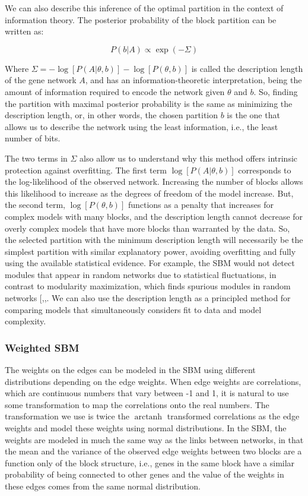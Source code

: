\documentclass[
]{article}
\begin{document}
We can also describe this inference of the optimal partition in the
context of information theory. The posterior probability of the block
partition can be written as:

\[
P(b|A) \propto \exp(-\Sigma)
\]

Where \(\Sigma = -\log[P(A|\theta, b)] - \log[P(\theta,b)]\) is called
the description length of the gene network \(A\), and has an
information-theoretic interpretation, being the amount of information
required to encode the network given \(\theta\) and \(b\). So, finding
the partition with maximal posterior probability is the same as
minimizing the description length, or, in other words, the chosen
partition \(b\) is the one that allows us to describe the network using
the least information, i.e., the least number of bits.

The two terms in \(\Sigma\) also allow us to understand why this method
offers intrinsic protection against overfitting. The first term
\(\log[P(A|\theta, b)]\) corresponds to the log-likelihood of the
observed network. Increasing the number of blocks allows this likelihood
to increase as the degrees of freedom of the model increase. But, the
second term, \(\log[P(\theta,b)]\) functions as a penalty that increases
for complex models with many blocks, and the description length cannot
decrease for overly complex models that have more blocks than warranted
by the data. So, the selected partition with the minimum description
length will necessarily be the simplest partition with similar
explanatory power, avoiding overfitting and fully using the available
statistical evidence. For example, the SBM would not detect modules that
appear in random networks due to statistical fluctuations, in contrast
to modularity maximization, which finds spurious modules in random
networks
{[},,\citeproc{ref-Guimera2004-jq}{25}{]}.
We can also use the description length as a principled method for
comparing models that simultaneously considers fit to data and model
complexity.

\subsubsection{Weighted SBM}\label{weighted-sbm}

The weights on the edges can be modeled in the SBM using different
distributions depending on the edge weights. When edge weights are
correlations, which are continuous numbers that vary between -1 and 1,
it is natural to use some transformation to map the correlations onto
the real numbers. The transformation we use is twice the
\(\mathop{\mathrm{arctanh}}\) transformed correlations as the edge
weights and model these weights using normal distributions. In the SBM,
the weights are modeled in much the same way as the links between
networks, in that the mean and the variance of the observed edge weights
between two blocks are a function only of the block structure, i.e.,
genes in the same block have a similar probability of being connected to
other genes and the value of the weights in these edges comes from the
same normal distribution.
\end{document}

